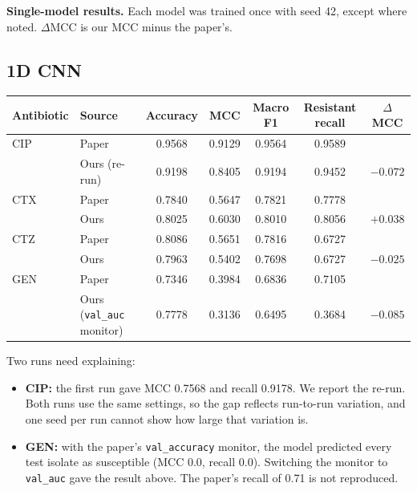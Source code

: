 \documentclass[11pt]{article}
\begin{document}
\textbf{Single-model results.} Each model was trained once with seed 42, except where noted. $\Delta$MCC is our MCC minus the paper's.

\subsection*{1D CNN}
\begin{center}
\begin{tabular}{llccccc}
\toprule
\textbf{Antibiotic} & \textbf{Source} & \textbf{Accuracy} & \textbf{MCC} & \textbf{Macro F1} & \textbf{Resistant recall} & \textbf{$\Delta$MCC} \\
\midrule
CIP & Paper & 0.9568 & 0.9129 & 0.9564 & 0.9589 & \\
    & Ours (re-run) & 0.9198 & 0.8405 & 0.9194 & 0.9452 & $-0.072$ \\
CTX & Paper & 0.7840 & 0.5647 & 0.7821 & 0.7778 & \\
    & Ours & 0.8025 & 0.6030 & 0.8010 & 0.8056 & $+0.038$ \\
CTZ & Paper & 0.8086 & 0.5651 & 0.7816 & 0.6727 & \\
    & Ours & 0.7963 & 0.5402 & 0.7698 & 0.6727 & $-0.025$ \\
GEN & Paper & 0.7346 & 0.3984 & 0.6836 & 0.7105 & \\
    & Ours (\texttt{val\_auc} monitor) & 0.7778 & 0.3136 & 0.6495 & 0.3684 & $-0.085$ \\
\bottomrule
\end{tabular}
\end{center}

Two runs need explaining:
\begin{itemize}[nosep]
    \item \textbf{CIP:} the first run gave MCC 0.7568 and recall 0.9178. We report the re-run. Both runs use the same settings, so the gap reflects run-to-run variation, and one seed per run cannot show how large that variation is.
    \item \textbf{GEN:} with the paper's \texttt{val\_accuracy} monitor, the model predicted every test isolate as susceptible (MCC 0.0, recall 0.0). Switching the monitor to \texttt{val\_auc} gave the result above. The paper's recall of 0.71 is not reproduced.
\end{itemize}
\end{document}
